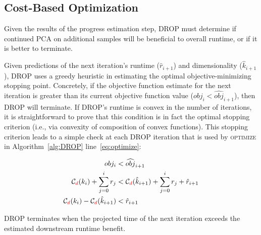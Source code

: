 \subsection{Cost-Based Optimization}
\label{subsec:opt}

Given the results of the progress estimation step, DROP must determine if continued PCA on additional samples will be beneficial to overall runtime, or if it is better to terminate. 

Given predictions of the next iteration's runtime ($\hat{r}_{i+1}$) and dimensionality ($\hat{k}_{i+1}$), DROP uses a greedy heuristic in estimating the optimal objective-minimizing stopping point.
Concretely, if the objective function estimate for the next iteration is greater than its current objective function value ($obj_i < \widehat{obj}_{i+1}$), then DROP will terminate. 
If DROP's runtime is convex in the number of iterations, it is straightforward to prove that this condition is in fact the optimal stopping criterion (i.e., via convexity of composition of convex functions). 
This stopping criterion leads to a simple check at each DROP iteration that is used by  \textsc{optimize} in Algorithm~\ref{alg:DROP} line~\ref{eq:optimize}: 

\vspace{-.4cm}
\begin{align}
  obj_i &< \widehat{obj}_{i+1} \nonumber \\
  \mathcal{C}_{\color{red}d}(k_i) + \sum_{j=0}^i r_j &< \mathcal{C}_{\color{red}d}(\hat{k}_{i+1}) + \sum_{j=0}^{i} r_j + \hat{r}_{i+1} \nonumber \\
  \mathcal{C}_{\color{red}d}(k_i) - \mathcal{C}_{\color{red}d}(\hat{k}_{i+1}) &< \hat{r}_{i+1}  \label{eq:check}
\end{align}

DROP terminates when the projected time of the next iteration exceeds the estimated downstream runtime benefit. 


